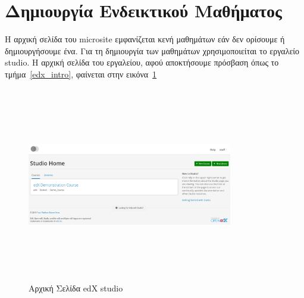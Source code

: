 \documentclass[12pt]{report}
\begin{document}
\section{Δημιουργία Eνδεικτικού Μαθήματος}\label{studio}
Η αρχική σελίδα του \textlatin{microsite} εμφανίζεται κενή μαθημάτων εάν δεν ορίσουμε ή δημιουργήσουμε ένα. Για τη δημιουργία των μαθημάτων χρησιμοποιείται το εργαλείο \textlatin{studio}. Η αρχική σελίδα του εργαλείου, αφού αποκτήσουμε πρόσβαση όπως το τμήμα~\ref{edx_intro}, φαίνεται στην εικόνα~\ref{fig:edx-studio-landing}
\begin{figure}[!htbp]
\centering
\includegraphics[width=0.8\textwidth, height=8.5cm]{edx-studio-landing}
\caption{Αρχική Σελίδα \textlatin{edX studio}}
\label{fig:edx-studio-landing}
\end{figure}
\end{document}

